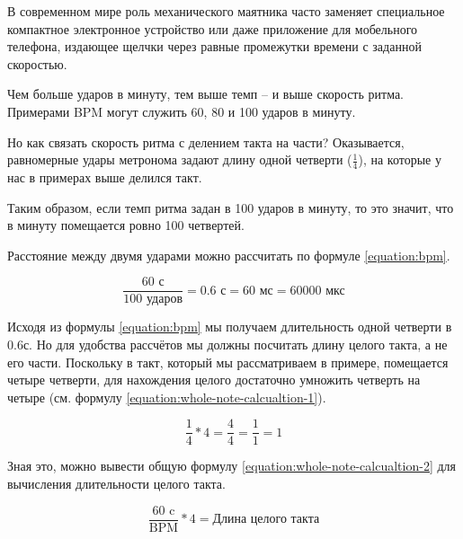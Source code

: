 \documentclass[a4paper,twoside]{book}
\begin{document}
В современном мире роль механического маятника часто заменяет специальное
компактное электронное устройство или даже приложение для мобельного телефона,
издающее щелчки через равные промежутки времени с заданной скоростью.

Чем больше ударов в минуту, тем выше темп -- и выше скорость ритма. Примерами BPM
могут служить 60, 80 и 100 ударов в минуту.

Но как связать скорость ритма с делением такта на части? Оказывается,
равномерные удары метронома задают длину одной четверти ($\frac{1}{4}$), на
которые у нас в примерах выше делился такт.

Таким образом, если темп ритма задан в 100 ударов в минуту, то это значит, что в
минуту помещается ровно 100 четвертей.


Расстояние между двумя ударами можно рассчитать по формуле \ref{equation:bpm}.

\begin{equation}
  \label{equation:bpm}
  \frac{\mbox{60 с}}{\mbox{100 ударов}} = \mbox{0.6 с} = \mbox{60 мс} = \mbox{60000 мкс}
\end{equation}

Исходя из формулы \ref{equation:bpm} мы получаем длительность одной четверти в
0.6с. Но для удобства рассчётов мы должны посчитать длину целого такта, а не его
части. Поскольку в такт, который мы рассматриваем в примере, помещается четыре
четверти, для нахождения целого достаточно умножить четверть на четыре (см.
формулу \ref{equation:whole-note-calcualtion-1}).

\begin{equation}
  \label{equation:whole-note-calcualtion-1}
  \frac{1}{4} * 4 = \frac{4}{4} = \frac{1}{1} = 1
\end{equation}

Зная это, можно вывести общую формулу \ref{equation:whole-note-calcualtion-2}
для вычисления длительности целого такта.

\begin{equation}
  \label{equation:whole-note-calcualtion-2}
  \frac{\mbox{60 c}}{\mbox{BPM}} * 4 = \mbox{Длина целого такта}
\end{equation}
\end{document}
